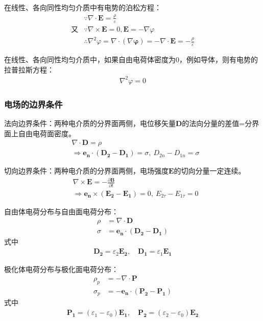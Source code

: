 \documentclass[withoutpreface,bwprint]{cumcmthesis} %
\begin{document}
在线性、各向同性均匀介质中有电势的泊松方程：
\begin{align}
    &\because \nabla \cdot \boldsymbol{E} = \frac{\rho}{\varepsilon}\\
    \mbox{又}&\because \nabla \times \boldsymbol{E} = 0, \boldsymbol{E} = -\nabla \varphi \\
    &\therefore \nabla^2 \varphi = \nabla \cdot (\nabla \boldsymbol{\varphi}) = -\nabla \cdot \boldsymbol{E} = -\frac{\rho}{\varepsilon }
\end{align}

在线性、各向同性均匀介质中，如果自由电荷体密度为0，例如导体，则有电势的拉普拉斯方程：
\begin{align}
    \nabla^2 \varphi = 0
\end{align}

\subsubsection{电场的边界条件}
法向边界条件：两种电介质的分界面两侧，电位移矢量$\boldsymbol{D}$的法向分量的差值=分界面上自由电荷面密度。
\begin{align}
    &\nabla \cdot \boldsymbol{D} = \rho\\
    &\Rightarrow \boldsymbol{e_n}\cdot (\boldsymbol{D_2}-\boldsymbol{D_1}) = \sigma, \ D_{2n} - D_{1n} = \sigma
\end{align}

切向边界条件：两种电介质的分界面两侧，电场强度$\boldsymbol{E}$的切向分量一定连续。
\begin{align}
    &\nabla \times \boldsymbol{E} = -\frac{\partial \boldsymbol{B}}{\partial t}\\
    &\Rightarrow \boldsymbol{e_n}\times (\boldsymbol{E_2}-\boldsymbol{E_1}) = 0, \ E_{2\tau} - E_{1\tau} = 0
\end{align}

自由体电荷分布与自由面电荷分布：
\begin{align}
    \rho &= \nabla \cdot \boldsymbol{D}\\
    \sigma &= \boldsymbol{e_n} \cdot (\boldsymbol{D_2}-\boldsymbol{D_1})
\end{align}
式中
\begin{align}
    \boldsymbol{D_2} = \varepsilon_2 \boldsymbol{E_2}, \quad \boldsymbol{D_1} = \varepsilon_1 \boldsymbol{E_1}
\end{align}

极化体电荷分布与极化面电荷分布：
\begin{align}
    {\rho_p} &= -\nabla \cdot \boldsymbol{P}\\
    {\sigma_p} &= -\boldsymbol{e_n} \cdot (\boldsymbol{P_2}-\boldsymbol{P_1})
\end{align}
式中
\begin{align}
    \boldsymbol{P_1} = (\varepsilon_1 - \varepsilon_0)\boldsymbol{E_1}, \quad 
    \boldsymbol{P_2} = (\varepsilon_2 - \varepsilon_0)\boldsymbol{E_2}
\end{align}
\end{document}
